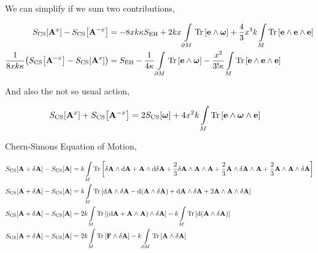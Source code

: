 We can simplify if we sum two contributions,

\begin{align*}
    S_{\textnormal{CS}}\qty[\vb A^x]-S_{\textnormal{CS}}\qty[\vb A^{-x}]&=-8xk\kappa S_{\textnormal{EH}}+2kx\int\limits_{\partial M}\Tr\qty[\vb e\wedge\boldsymbol\omega]+\frac43x^3k\int\limits_M\Tr\qty[\vb e\wedge\vb e\wedge\vb e]\\
    \frac{1}{8xk\kappa}\qty(S_{\textnormal{CS}}\qty[\vb A^{-x}]-S_{\textnormal{CS}}\qty[\vb A^x])&=S_{\textnormal{EH}}-\frac{1}{4\kappa}\int\limits_{\partial M}\Tr\qty[\vb e\wedge\boldsymbol\omega]-\frac{x^2}{3!\kappa}\int\limits_M\Tr\qty[\vb e\wedge\vb e\wedge\vb e]
\end{align*}

And also the not so usual action,

\begin{align*}
    S_{\textnormal{CS}}\qty[\vb A^x]+S_{\textnormal{CS}}\qty[\vb A^{-x}]&=2S_{\textnormal{CS}}\qty[\boldsymbol\omega]+4x^2k\int\limits_M\Tr\qty[\vb e\wedge\boldsymbol\omega\wedge\vb e]
\end{align*}

Chern-Simons Equation of Motion,

\begin{align*}
    S_{\textnormal{CS}}\qty[\vb A+\delta\vb A]-S_{\textnormal{CS}}\qty[\vb A]&=k\int\limits_M\Tr\qty[\delta\vb A\wedge\dd{\vb A}+\vb A\wedge\dd{\delta\vb A}+\frac23\delta\vb A\wedge\vb A\wedge\vb A+\frac23\vb A\wedge\delta\vb A\wedge\vb A+\frac23\vb A\wedge\vb A\wedge\delta\vb A]\\
    S_{\textnormal{CS}}\qty[\vb A+\delta\vb A]-S_{\textnormal{CS}}\qty[\vb A]&=k\int\limits_M\Tr\qty[\dd{\vb A}\wedge\delta\vb A-\dd{\qty(\vb A\wedge\delta\vb A)}+\dd{\vb A}\wedge\delta \vb A+2\vb A\wedge\vb A\wedge\delta\vb A]\\
    S_{\textnormal{CS}}\qty[\vb A+\delta\vb A]-S_{\textnormal{CS}}\qty[\vb A]&=2k\int\limits_M\Tr\qty[\qty(\dd{\vb A}+\vb A\wedge\vb A)\wedge\delta\vb A]-k\int\limits_M\Tr\qty[\dd{\qty(\vb A\wedge\delta\vb A)}]\\
    S_{\textnormal{CS}}\qty[\vb A+\delta\vb A]-S_{\textnormal{CS}}\qty[\vb A]&=2k\int\limits_M\Tr\qty[\vb F\wedge\delta\vb A]-k\int\limits_{\partial M}\Tr\qty[\vb A\wedge\delta\vb A]
\end{align*}